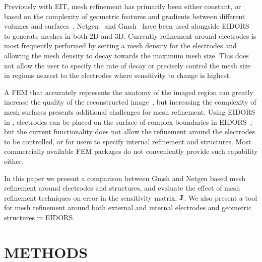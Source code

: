 \documentclass[12pt]{iopart}
\begin{document}
Previously with EIT, mesh refinement has primarily been either 
constant, or based on 
the complexity of geometric features
and gradients between different volumes and surfaces~\parencite{grychtol_fem_2013}.  
Netgen~\parencite{schoberl_netgen_1997} and Gmsh~\parencite{geuzaine_gmsh_2009} have been used alongside 
EIDORS~\parencite{adler_uses_2006} to generate meshes in both 2D and 3D. 
Currently refinement around electrodes is most frequently performed by 
setting a mesh density for the electrodes and allowing the mesh density to 
decay towards the maximum mesh size. This does not allow the user to specify 
the rate of decay or precisely control the mesh size in regions nearest to 
the  electrodes where sensitivity to change is highest.

A FEM that accurately represents the anatomy of the imaged region 
can greatly increase the quality of the reconstructed image~\parencite{grychtol_impact_2012},
but increasing the complexity of mesh surfaces presents additional challenges for
mesh refinement. Using EIDORS in ,  electrodes can be placed on the surface of complex boundaries in 
EIDORS~\parencite{grychtol_fem_2013}, but the current functionality does not allow the
refinement around the electrodes to be controlled, or for users to specify internal 
refinement and structures.
Most commercially available FEM packages
do not conveniently provide such capability either.


In this paper we present a comparison between Gmsh and 
Netgen based mesh refinement around electrodes and structures, and evaluate the 
effect of mesh refinement techniques on error in  the sensitivity matrix, 
$\bf J$. 
We also present a tool for mesh refinement around both external and internal
electrodes and geometric structures in EIDORS. 

\section{METHODS}
\end{document}
